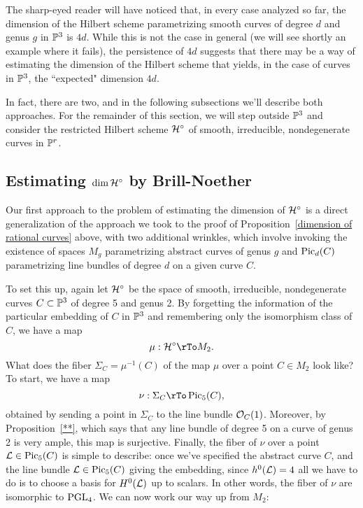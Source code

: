The sharp-eyed reader will have noticed that, in every case analyzed so far, the dimension of the Hilbert scheme parametrizing smooth curves of degree $d$ and genus $g$ in $\PP^3$ is $4d$. While this is not the case in general (we will see shortly an example where it fails), the persistence of $4d$ suggests that there may be a way of estimating the dimension of the Hilbert scheme that yields, in the case of curves in $\PP^3$, the ``expected" dimension $4d$.

In fact, there are two, and in the following subsections we'll describe both approaches. For the remainder of this section, we will step outside $\PP^3$ and consider the restricted Hilbert scheme $\cH^\circ$ of smooth, irreducible, nondegenerate curves in $\PP^r$.

\subsection{Estimating $\dim \cH^\circ$ by Brill-Noether}

Our first approach to the problem of estimating the dimension of $\cH^\circ$ is a direct generalization of the approach we took to the proof of Proposition~\ref{dimension of rational curves} above, with two additional wrinkles, which involve invoking the existence of  spaces $M_g$ parametrizing abstract curves of genus $g$ and $\Pic_d(C)$ parametrizing line bundles of degree $d$ on a given curve $C$.

To set this up, again let $\cH^\circ$ be the space of smooth, irreducible, nondegenerate curves $C \subset \PP^3$ of degree 5 and genus 2. By forgetting the information of the particular embedding of $C$ in $\PP^3$ and remembering only the isomorphism class of $C$, we have a map
$$
\mu : \cH^\circ \rTo M_2.
$$
What does the fiber $\Sigma_C =\mu^{-1}(C)$ of the map $\mu$ over a point $C \in M_2$ look like? To start, we have a map
$$
\nu : \Sigma_C \rTo \Pic_5(C),
$$
obtained by sending a point in $\Sigma_C$ to the line bundle $\cO_C(1)$. Moreover, by Proposition~\ref{**}, which says that any line bundle of degree 5 on a curve of genus 2 is very ample, this map is surjective. Finally, the fiber of $\nu$ over a point $\cL \in \Pic_5(C)$ is simple to describe: once we've specified the abstract curve $C$, and the line bundle $\cL \in \Pic_5(C)$ giving the embedding, since $h^0(\cL) = 4$ all we have to do is to choose a basis for $H^0(\cL)$ up to scalars. In other words, the fiber of $\nu$ are isomorphic to $\PGL_4$. We can now work our way up from $M_2$:

